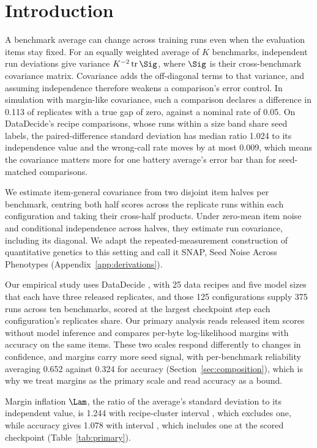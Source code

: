 \section{Introduction}
A benchmark average can change across training runs even when the evaluation items stay fixed. For an equally weighted average of $K$ benchmarks, independent run deviations give variance $K^{-2}\operatorname{tr}\Sig$, where $\Sig$ is their cross-benchmark covariance matrix. Covariance adds the off-diagonal terms to that variance, and assuming independence therefore weakens a comparison's error control. In simulation with margin-like covariance, such a comparison declares a difference in 0.113 of replicates with a true gap of zero, against a nominal rate of 0.05. On DataDecide's recipe comparisons, whose runs within a size band share seed labels, the paired-difference standard deviation has median ratio 1.024 to its independence value and the wrong-call rate moves by at most 0.009, which means the covariance matters more for one battery average's error bar than for seed-matched comparisons.

We estimate item-general covariance from two disjoint item halves per benchmark, centring both half scores across the replicate runs within each configuration and taking their cross-half products. Under zero-mean item noise and conditional independence across halves, they estimate run covariance, including its diagonal. We adapt the repeated-measurement construction of quantitative genetics to this setting and call it SNAP, Seed Noise Across Phenotypes (Appendix~\ref{app:derivations}).

Our empirical study uses DataDecide \citep{magnusson2025}, with 25 data recipes and five model sizes that each have three released replicates, and those 125 configurations supply 375 runs across ten benchmarks, scored at the largest checkpoint step each configuration's replicates share. Our primary analysis reads released item scores without model inference and compares per-byte log-likelihood margins with accuracy on the same items. These two scales respond differently to changes in confidence, and margins carry more seed signal, with per-benchmark reliability averaging 0.652 against 0.324 for accuracy (Section~\ref{sec:composition}), which is why we treat margins as the primary scale and read accuracy as a bound.

Margin inflation $\Lam$, the ratio of the average's standard deviation to its independent value, is 1.244 with recipe-cluster interval , which excludes one, while accuracy gives 1.078 with interval , which includes one at the scored checkpoint (Table~\ref{tab:primary}).

